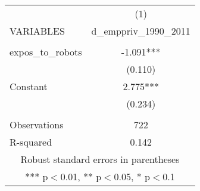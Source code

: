 \documentclass[]{article}
\begin{document}
\begin{tabular}{lc} \hline
 & (1) \\
VARIABLES & d\_emppriv\_1990\_2011 \\ \hline
 &  \\
expos\_to\_robots & -1.091*** \\
 & (0.110) \\
Constant & 2.775*** \\
 & (0.234) \\
 &  \\
Observations & 722 \\
 R-squared & 0.142 \\ \hline
\multicolumn{2}{c}{ Robust standard errors in parentheses} \\
\multicolumn{2}{c}{ *** p$<$0.01, ** p$<$0.05, * p$<$0.1} \\
\end{tabular}
\end{document}
